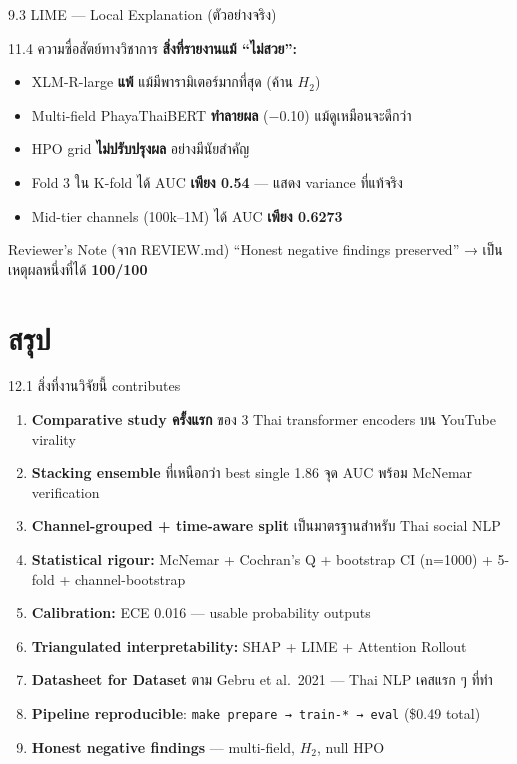 \documentclass[aspectratio=169,11pt,xcolor=dvipsnames]{beamer}
\newcommand{\hl}[1]{\textcolor{kmitlOrange}{\textbf{#1}}}
\newcommand{\hlb}[1]{\textcolor{kmitlBlue}{\textbf{#1}}}
\begin{document}
\begin{frame}{9.3 LIME — Local Explanation (ตัวอย่างจริง)}
\begin{center}
\begin{frame}{11.4 ความซื่อสัตย์ทางวิชาการ}
  \textbf{สิ่งที่รายงานแม้ ``ไม่สวย'':}
  \begin{itemize}
    \item XLM-R-large \hl{แพ้} แม้มีพารามิเตอร์มากที่สุด (ค้าน $H_2$)
    \item Multi-field PhayaThaiBERT \hl{ทำลายผล} ($-$0.10) แม้ดูเหมือนจะดีกว่า
    \item HPO grid \hl{ไม่ปรับปรุงผล} อย่างมีนัยสำคัญ
    \item Fold 3 ใน K-fold ได้ AUC \hl{เพียง 0.54} — แสดง variance ที่แท้จริง
    \item Mid-tier channels (100k--1M) ได้ AUC \hl{เพียง 0.6273}
  \end{itemize}
  \vspace{0.4em}
  \begin{block}{Reviewer's Note (จาก REVIEW.md)}
    ``Honest negative findings preserved'' → เป็นเหตุผลหนึ่งที่ได้ \hl{100/100}
  \end{block}
\end{frame}

\section{สรุป}

\begin{frame}{12.1 สิ่งที่งานวิจัยนี้ contributes}
  \begin{enumerate}\setlength\itemsep{0.4em}
    \item \hlb{Comparative study ครั้งแรก} ของ 3 Thai transformer encoders บน YouTube virality
    \item \hlb{Stacking ensemble} ที่เหนือกว่า best single 1.86 จุด AUC พร้อม McNemar verification
    \item \hlb{Channel-grouped + time-aware split} เป็นมาตรฐานสำหรับ Thai social NLP
    \item \hlb{Statistical rigour:} McNemar + Cochran's Q + bootstrap CI (n=1000) + 5-fold + channel-bootstrap
    \item \hlb{Calibration:} ECE 0.016 — usable probability outputs
    \item \hlb{Triangulated interpretability:} SHAP + LIME + Attention Rollout
    \item \hlb{Datasheet for Dataset} ตาม Gebru et al.\ 2021 — Thai NLP เคสแรก ๆ ที่ทำ
    \item \hlb{Pipeline reproducible}: \texttt{make prepare → train-* → eval} (\$0.49 total)
    \item \hlb{Honest negative findings} — multi-field, $H_2$, null HPO
  \end{enumerate}
\end{frame}


\end{center}
\end{frame}
\end{document}

